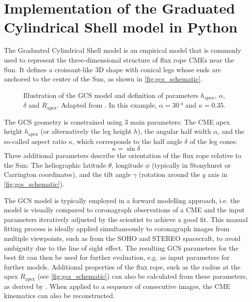 \chapter{Implementation of the Graduated Cylindrical Shell model in Python}
\label{chp:GCS_Python}

The Graduated Cylindrical Shell model \citep[GCS,][]{Thernisien-2006-GCS,Thernisien-2011-GCS} is an empirical model that is commonly used to represent the three-dimensional structure of flux rope CMEs near the Sun. It defines a croissant-like 3D shape with conical legs whose ends are anchored to the center of the Sun, as shown in \autoref{fig:gcs_schematic}.

\begin{figure}
    
    \caption[Illustration of the GCS model]{Illustration of the GCS model and definition of parameters $h_\text{apex}$, $\alpha$, $\delta$ and $R_\text{apex}$. Adapted from \citet{Thernisien-2011-GCS}. In this example, $\alpha = \SI{30}{\degree}$ and $\kappa = 0.35$.}
    \label{fig:gcs_schematic}
\end{figure}

The GCS geometry is constrained using 3 main parameters: The CME apex height $h_\text{apex}$ (or alternatively the leg height $h$), the angular half width $\alpha$, and the so-called aspect ratio $\kappa$, which corresponds to the half angle $\delta$ of the leg cones:
\begin{equation}
    \kappa = \sin \delta
\end{equation}
Three additional parameters describe the orientation of the flux rope relative to the Sun: The heliographic latitude $\theta$, longitude $\phi$ (typically in Stonyhurst or Carrington coordinates), and the tilt angle $\gamma$ (rotation around the $y$ axis in \autoref{fig:gcs_schematic}).

The GCS model is typically employed in a forward modelling approach, i.e. the model is visually compared to coronagraph observations of a CME and the input parameters iteratively adjusted by the scientist to achieve a good fit. This manual fitting process is ideally applied simultaneously to coronagraph images from multiple viewpoints, such as from the SOHO and STEREO spacecraft, to avoid ambiguity due to the line of sight effect. The resulting GCS parameters for the best fit can then be used for further evaluation, e.g. as input parameters for further models. Additional properties of the flux rope, such as the radius at the apex $R_\text{apex}$ (see \autoref{fig:gcs_schematic}) can also be calculated from these parameters, as derived by \citep{Thernisien-2011-GCS}. When applied to a sequence of consecutive images, the CME kinematics can also be reconstructed.

